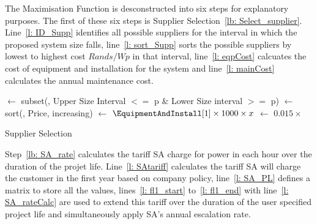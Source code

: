 \documentclass[a4paper,11pt,fleqn]{report}
\begin{document}
The Maximisation Function is desconstructed into six steps for explanatory purposes. The first of these six steps is Supplier Selection~\ref{lb: Select_supplier}. Line~\ref{l: ID_Supp} identifies all possible suppliers for the interval in which the proposed system size falls, line~\ref{l: sort_Supp} sorts the possible suppliers by lowest to highest cost $Rands/Wp$ in that interval, line~\ref{l: eqpCost} calcuates the cost of equipment and installation for the system and line~\ref{l: mainCost} calculates the annual maintenance cost.\\

\begin{algorithm}[H]
  \DontPrintSemicolon
   
      			  
	\BlankLine
	\CostData$\leftarrow$ subset(\CostData, Upper Size Interval $<=$ p & Lower Size interval $>=$ p)\; \label{l: ID_Supp}
	\EquipmentAndInstall$\leftarrow$ sort(\CostData, Price, increasing)\; \label{l: sort_Supp}
	\EquipmentAndInstall$\leftarrow$ $\EquipmentAndInstall[1]\times 1000\times x$\; \label{l: eqpCost}
	\maintenanceAnnual$\leftarrow$  $0.015\times$ \EquipmentAndInstall\; \label{l: mainCost}
\caption{Supplier Selection}\label{lb: Select_supplier}
\end{algorithm}

Step~\ref{lb: SA_rate} calculates the tariff \ac{SA} charge for power in each hour over the duration of the projet life. Line~\ref{l: SAtariff} calculates the tariff \ac{SA} will charge the customer in the first year based on company policy, line~\ref{l: SA_PL} defines a matrix to store all the values, lines~\ref{l: fl1_start} to~\ref{l: fl1_end} with line~\ref{l: SA_rateCalc} are used to extend this tariff over the duration of the user specified project life and simultaneously apply \ac{SA}'s annual escalation rate.
\end{document}
